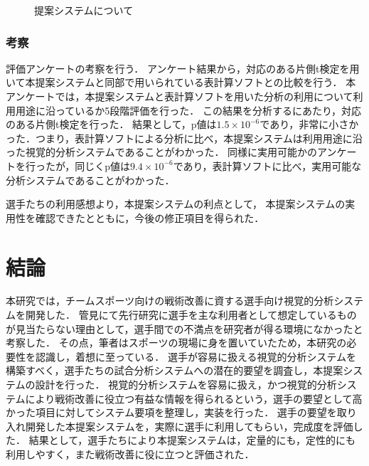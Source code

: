 \documentclass[sotsuron]{kuee}
\begin{document}
			\begin{figure}
				\begin{center}
				\end{center}
				\caption{提案システムについて}
		  		\label{fig:result08}
			\end{figure}
		\subsection{考察}
			評価アンケートの考察を行う．
			アンケート結果から，対応のある片側t検定を用いて本提案システムと同部で用いられている表計算ソフトとの比較を行う．
			本アンケートでは，本提案システムと表計算ソフトを用いた分析の利用について利用用途に沿っているか5段階評価を行った．
			この結果を分析するにあたり，対応のある片側t検定を行った．
			結果として，p値は$1.5 \times 10^{-6}$であり，非常に小さかった．つまり，表計算ソフトによる分析に比べ，本提案システムは利用用途に沿った視覚的分析システムであることがわかった．
			同様に実用可能かのアンケートを行ったが，同じくp値は$9.4 \times 10^{-6}$であり，表計算ソフトに比べ，実用可能な分析システムであることがわかった．

			選手たちの利用感想より，本提案システムの利点として，	
			本提案システムの実用性を確認できたとともに，今後の修正項目を得られた．

\chapter{結論}
	本研究では，チームスポーツ向けの戦術改善に資する選手向け視覚的分析システムを開発した．
	管見にて先行研究に選手を主な利用者として想定しているものが見当たらない理由として，選手間での不満点を研究者が得る環境になかったと考察した．
	その点，筆者はスポーツの現場に身を置いていたため，本研究の必要性を認識し，着想に至っている．
	選手が容易に扱える視覚的分析システムを構築すべく，選手たちの試合分析システムへの潜在的要望を調査し，本提案システムの設計を行った．
	視覚的分析システムを容易に扱え，かつ視覚的分析システムにより戦術改善に役立つ有益な情報を得られるという，選手の要望として高かった項目に対してシステム要項を整理し，実装を行った．
	選手の要望を取り入れ開発した本提案システムを，実際に選手に利用してもらい，完成度を評価した．
	結果として，選手たちにより本提案システムは，定量的にも，定性的にも利用しやすく，また戦術改善に役に立つと評価された．
\end{document}
